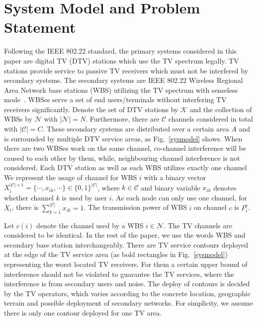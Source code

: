 \section{System Model and Problem Statement}
\label{SystemModel}
Following the IEEE 802.22 standard, the primary systems considered in this paper are digital TV (DTV) stations which use the TV spectrum legally. TV stations provide service to passive TV receivers which must not be interfered by secondary systems. 
The secondary systems are IEEE 802.22 Wireless Regional Area Network base stations (WBS) utilizing the TV spectrum with senseless mode~\cite{SenseLess2011}. 
WBSes serve a set of end users/terminals without interfering TV receivers significantly.
Denote the set of DTV stations by $\mathcal{K}$ and the collection of WBSs by $\mathcal{N}$ with $| \mathcal{N}|=N$. 
Furthermore, there are $\mathcal{C}$ channels considered in total with $|\mathcal{C}| = C$. 
These secondary systems are distributed over a certain area $A$ and is surrounded by multiple DTV service areas, as Fig.~\ref{sysmodel} shows. 
When there are two WBSes work on the same channel, co-channel interference will be caused to each other by them, while, neighbouring channel interference is not considered. Each DTV station as well as each WBS utilizes exactly one channel 
We represent the usage of channel for WBS $i$ with a binary vector $X_i^{|\mathcal{C}|\times 1}=\{\cdots, x_{ik}, \cdots\}\in \{0,1\}^{|\mathcal{C}|}$, where $k\in \mathcal{C}$ and binary variable $x_{ik}$ denotes whether channel $k$ is used by user $i$. As each node can only use one channel, for $X_i$, there is $\sum_{k=1}^{|\mathcal{C}|}x_{ik}=1$. 
The transmission power of WBS $i$ on channel $c$ is $P_i^c$. 

Let $c(i)$ denote the channel used by a WBS $i\in \mathcal{N}$. 
The TV channels are considered to be identical. 
In the rest of the paper, we use the words WBS and secondary base station interchangeably. 
There are TV service contours deployed at the edge of the TV service area (as bold rectangles in Fig.~\ref{sysmodel}) representing the worst located TV receivers. 
For them a certain upper bound of interference should not be violated to guarantee the TV services, where the interference is from secondary users and noise. 
The deploy of contours is decided by the TV operators, which varies according to the concrete location, geographic terrain and possible deployment of secondary networks. 
For simplicity, we assume there is only one contour deployed for one TV area. %

